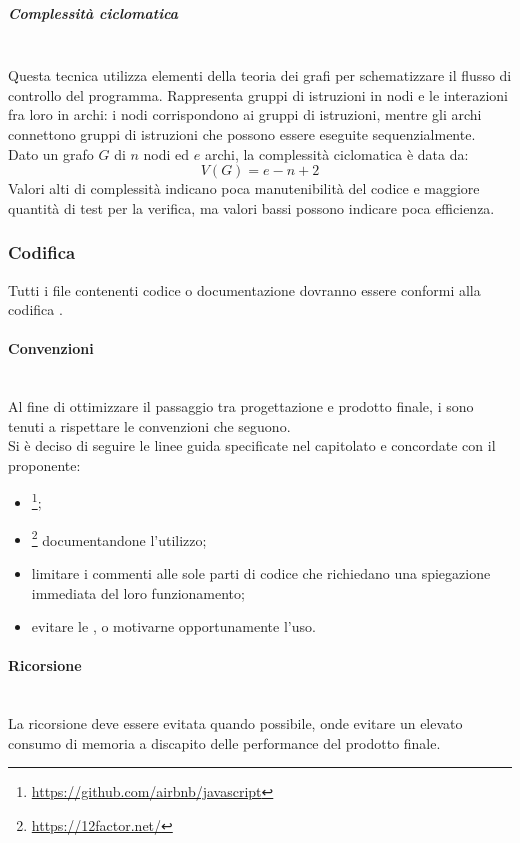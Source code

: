 \subparagraph{Complessità ciclomatica}\mbox{}\\
Questa tecnica utilizza elementi della teoria dei grafi per schematizzare il flusso di controllo del programma. Rappresenta gruppi di istruzioni in nodi e le interazioni fra loro in archi: i nodi corrispondono ai gruppi di istruzioni, mentre gli archi connettono gruppi di istruzioni che possono essere eseguite sequenzialmente.\\
Dato un grafo $G$ di $n$ nodi ed $e$ archi, la complessità ciclomatica è data da:
\[ V\left(G\right) = e - n + 2 \]
Valori alti di complessità indicano poca manutenibilità del codice e maggiore quantità di test per la verifica, ma valori bassi possono indicare poca efficienza.

\subsubsection{Codifica}
Tutti i file contenenti codice o documentazione dovranno essere conformi alla codifica .

\paragraph{Convenzioni} \label{sec:convenzioni}\mbox{}\\
Al fine di ottimizzare il passaggio tra progettazione e prodotto finale, i \Programmatori{} sono tenuti a rispettare le convenzioni che seguono.\\
Si è deciso di seguire le linee guida specificate nel capitolato e concordate con il proponente:
\begin{itemize}
	\item {}\footnote{\url{https://github.com/airbnb/javascript}};
	\item {}\footnote{\url{https://12factor.net/}} documentandone l'utilizzo;
	\item limitare i commenti alle sole parti di codice che richiedano una spiegazione immediata del loro funzionamento;
	\item evitare le , o motivarne opportunamente l’uso.
\end{itemize}
\paragraph{Ricorsione}\mbox{}\\
La ricorsione deve essere evitata quando possibile, onde evitare un elevato consumo di memoria a discapito delle performance del prodotto finale.


